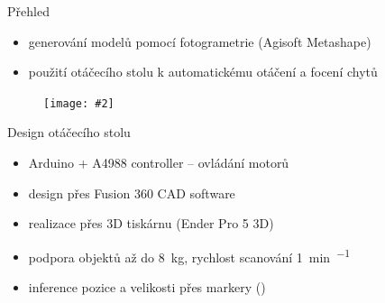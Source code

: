 \documentclass[czech]{beamer}
\makeatletter
\newcommand{\fitimage}[2][\@nil]{
	\begin{figure}
		\begin{adjustbox}{width=0.9\textwidth, totalheight=\textheight-2\baselineskip-2\baselineskip,keepaspectratio}
			\texttt{[image: \#2]}
		\end{adjustbox}
		\def\tmp{#1}%
	 \ifx\tmp\@nnil
			\else
			\caption*{#1}
		\fi
	\end{figure}
}
\makeatother
\begin{document}
	\begin{frame}{Přehled}
		\begin{itemize}
			\item generování modelů pomocí fotogrametrie (Agisoft Metashape)
			\item použití otáčecího stolu k automatickému otáčení a focení chytů
		\end{itemize}

		\fitimage{images/setup.jpg}
	\end{frame}

	\begin{frame}{Design otáčecího stolu}
		\begin{itemize}
			\item Arduino + A4988 controller -- ovládání motorů
			\item design přes Fusion 360 CAD software
			\item realizace přes 3D tiskárnu (Ender Pro 5 3D)
			\item podpora objektů až do \SI{8}{\kilo\gram}, rychlost scanování \SI{1}{\minute\per\hold}
			\item inference pozice a velikosti přes markery (\raisebox{-0.29em}{})
		\end{itemize}


\end{frame}
\end{document}
